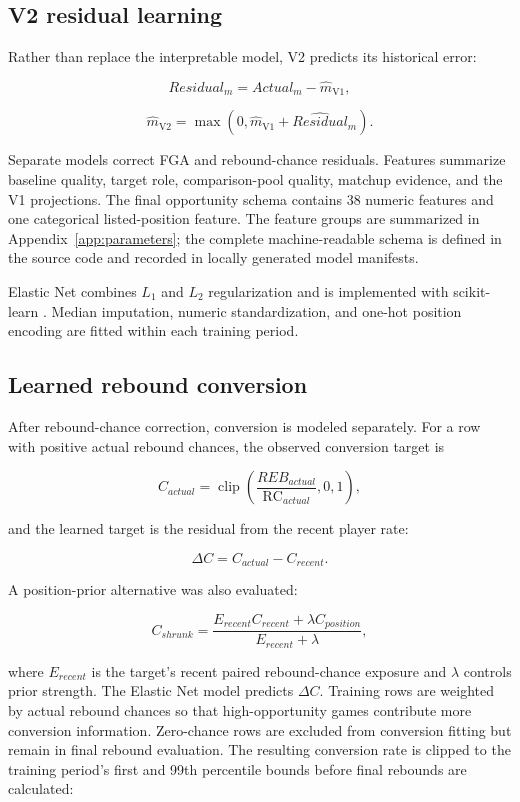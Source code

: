\documentclass[11pt]{article}
\newcommand{\RC}{\mathrm{RC}}
\newcommand{\Vone}{\mathrm{V1}}
\newcommand{\Vtwo}{\mathrm{V2}}
\begin{document}
\subsection{V2 residual learning}

Rather than replace the interpretable model, V2 predicts its historical error:

\[
Residual_m=Actual_m-\widehat{m}_{\Vone},
\]

\[
\widehat{m}_{\Vtwo}=\max(0,
\widehat{m}_{\Vone}+\widehat{Residual}_m).
\]

Separate models correct FGA and rebound-chance residuals. Features summarize
baseline quality, target role, comparison-pool quality, matchup evidence, and
the V1 projections. The final opportunity schema contains 38 numeric features
and one categorical listed-position feature. The feature groups are summarized
in Appendix~\ref{app:parameters}; the complete machine-readable schema is
defined in the source code and recorded in locally generated model manifests.

Elastic Net combines $L_1$ and $L_2$ regularization \cite{zouhastie} and is
implemented with scikit-learn \cite{scikitlearn}. Median imputation, numeric
standardization, and one-hot position encoding are fitted within each training
period.

\subsection{Learned rebound conversion}

After rebound-chance correction, conversion is modeled separately. For a row
with positive actual rebound chances, the observed conversion target is

\[
C_{actual}=\operatorname{clip}\left(
\frac{REB_{actual}}{\RC_{actual}},0,1\right),
\]

and the learned target is the residual from the recent player rate:

\[
\Delta C=C_{actual}-C_{recent}.
\]

A position-prior alternative was also evaluated:

\[
C_{shrunk}=\frac{E_{recent}C_{recent}+\lambda C_{position}}
{E_{recent}+\lambda},
\]

where $E_{recent}$ is the target's recent paired rebound-chance exposure and
$\lambda$ controls prior strength. The Elastic Net model predicts $\Delta C$.
Training rows are weighted by actual rebound chances so that high-opportunity
games contribute more conversion information. Zero-chance rows are excluded
from conversion fitting but remain in final rebound evaluation. The resulting
conversion rate is clipped to the training period's first and 99th percentile
bounds before final rebounds are calculated:
\end{document}
